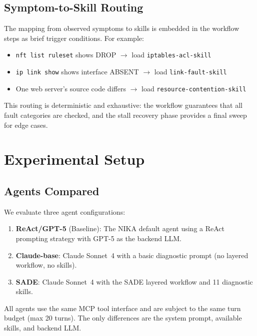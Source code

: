 \documentclass[conference]{IEEEtran}
\begin{document}
\subsection{Symptom-to-Skill Routing}

The mapping from observed symptoms to skills is embedded in the workflow steps as brief trigger conditions. For example:

\begin{itemize}    \item \texttt{nft list ruleset} shows DROP $\rightarrow$ load \texttt{iptables-acl-skill}
    \item \texttt{ip link show} shows interface ABSENT $\rightarrow$ load \texttt{link-fault-skill}
    \item One web server's source code differs $\rightarrow$ load \texttt{resource-contention-skill}
\end{itemize}

This routing is deterministic and exhaustive: the workflow guarantees that all fault categories are checked, and the stall recovery phase provides a final sweep for edge cases.

\section{Experimental Setup}

\subsection{Agents Compared}

We evaluate three agent configurations:

\begin{enumerate}    \item \textbf{ReAct/GPT-5} (Baseline): The NIKA default agent using a ReAct prompting strategy with GPT-5 as the backend LLM.
    \item \textbf{Claude-base}: Claude Sonnet~4 with a basic diagnostic prompt (no layered workflow, no skills).
    \item \textbf{SADE}: Claude Sonnet~4 with the SADE layered workflow and 11 diagnostic skills.
\end{enumerate}

All agents use the same MCP tool interface and are subject to the same turn budget (max 20 turns). The only differences are the system prompt, available skills, and backend LLM.
\end{document}
